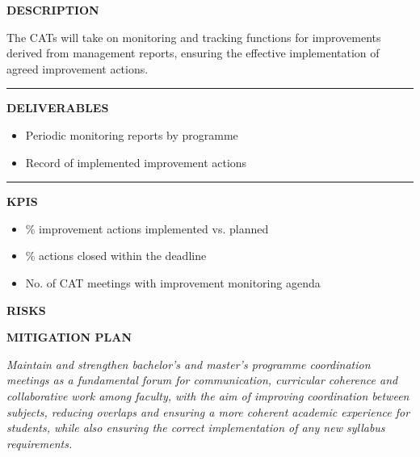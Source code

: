 \documentclass[11pt,a4paper]{scrreprt}
\newcommand{\fieldlabel}[1]{%
  {\footnotesize\sffamily\bfseries\color{mutedcolor}\MakeUppercase{#1}}\par\nopagebreak[4]
}
\newcommand{\fieldsep}{\vspace{3pt}\noindent\textcolor{bordercolor}{\rule{\linewidth}{0.4pt}}\vspace{3pt}\par}
\begin{document}
\begin{tcolorbox}[pabox={gobcolor}{A.P.2.2 \enspace\textbullet\enspace Monitoring and tracking of improvements by CATs}]

\fieldlabel{Description}
{\small The CATs will take on monitoring and tracking functions for improvements derived from management reports, ensuring the effective implementation of agreed improvement actions.}\par
\fieldsep
\fieldlabel{Deliverables}
{\small \begin{itemize}[noitemsep,topsep=2pt]
\item Periodic monitoring reports by programme
\item Record of implemented improvement actions
\end{itemize}}\par
\fieldsep
\fieldlabel{KPIs}
{\small \begin{itemize}[noitemsep,topsep=2pt]
\item \% improvement actions implemented vs. planned
\item \% actions closed within the deadline
\item No. of CAT meetings with improvement monitoring agenda
\end{itemize}}\par
\end{tcolorbox}
\begin{tcolorbox}[riskbox]
{\footnotesize\sffamily\bfseries\color{red!50!black} RISKS}\par{}
\end{tcolorbox}
\begin{tcolorbox}[mitbox]
{\footnotesize\sffamily\bfseries\color{green!40!black} MITIGATION PLAN}\par{}
\end{tcolorbox}
\vspace{8pt}

\newpage
{}
{\small\color{mutedcolor}\itshape Maintain and strengthen bachelor's and master's programme coordination meetings as a fundamental forum for communication, curricular coherence and collaborative work among faculty, with the aim of improving coordination between subjects, reducing overlaps and ensuring a more coherent academic experience for students, while also ensuring the correct implementation of any new syllabus requirements.}\par\vspace{6pt}
\end{document}
